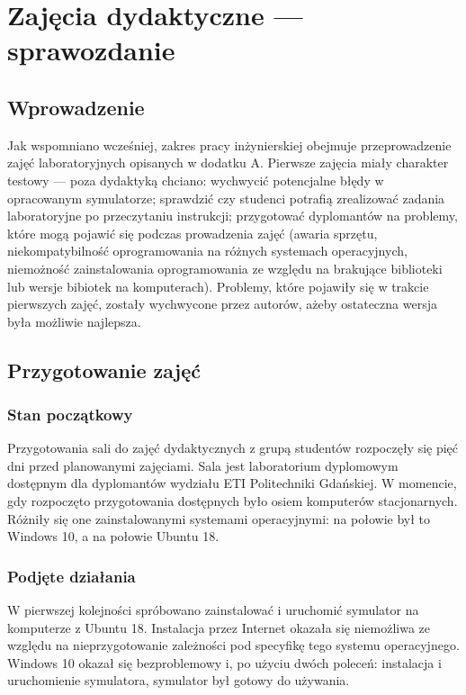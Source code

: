 \section{Zajęcia dydaktyczne --- sprawozdanie}
\subsection{Wprowadzenie}

Jak wspomniano wcześniej, zakres pracy inżynierskiej obejmuje przeprowadzenie zajęć laboratoryjnych opisanych w dodatku A.
Pierwsze zajęcia miały charakter testowy --- poza dydaktyką chciano: wychwycić potencjalne błędy w opracowanym symulatorze; sprawdzić czy studenci
potrafią zrealizować zadania laboratoryjne po przeczytaniu instrukcji; przygotować dyplomantów na problemy, które mogą pojawić się podczas prowadzenia
zajęć (awaria sprzętu, niekompatybilność oprogramowania na różnych systemach operacyjnych, niemożność zainstalowania oprogramowania ze względu na brakujące
biblioteki lub wersje bibiotek na komputerach). Problemy, które pojawiły się w trakcie pierwszych zajęć, zostały wychwycone przez autorów, ażeby
ostateczna wersja była możliwie najlepsza.

\subsection{Przygotowanie zajęć}
\subsubsection{Stan początkowy}
Przygotowania sali do zajęć dydaktycznych z grupą studentów rozpoczęły się pięć dni przed planowanymi zajęciami. Sala jest laboratorium dyplomowym dostępnym dla dyplomantów wydziału ETI Politechniki Gdańskiej. W momencie, gdy rozpoczęto przygotowania dostępnych było osiem komputerów stacjonarnych. Różniły się one zainstalowanymi systemami operacyjnymi: na połowie był to Windows 10, a na połowie Ubuntu 18.

\subsubsection{Podjęte działania}
W pierwszej kolejności spróbowano zainstalować i uruchomić symulator na komputerze z Ubuntu 18. Instalacja przez Internet okazała się niemożliwa ze względu na nieprzygotowanie zależności pod specyfikę tego systemu operacyjnego. Windows 10 okazał się bezproblemowy i, po użyciu dwóch poleceń: instalacja i uruchomienie symulatora, symulator był gotowy do używania.

